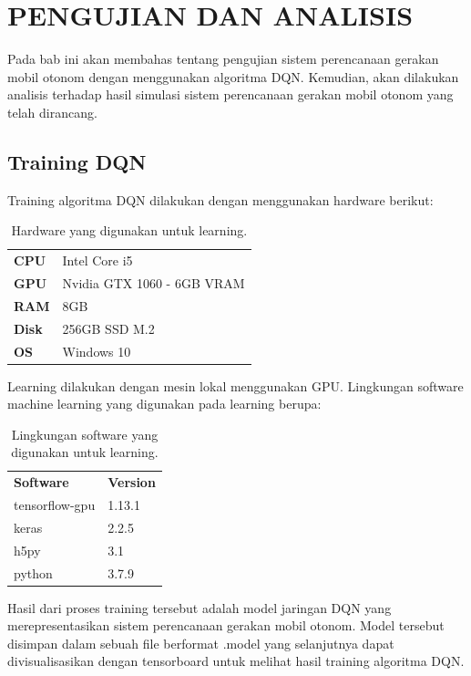 \chapter{PENGUJIAN DAN ANALISIS}
\label{chap:pengujiananalisis}


Pada bab ini akan membahas tentang pengujian sistem perencanaan gerakan mobil otonom dengan menggunakan algoritma DQN. Kemudian, akan dilakukan analisis terhadap hasil simulasi sistem
perencanaan gerakan mobil otonom yang telah dirancang.

\section{Training DQN}
\label{sec:training_dqn}
Training algoritma DQN dilakukan dengan menggunakan hardware berikut:
\begin{table}[H]
	\begin{tabular}{ll}
		\textbf{CPU}  & Intel Core i5              \\
		\textbf{GPU}  & Nvidia GTX 1060 - 6GB VRAM \\
		\textbf{RAM}  & 8GB                        \\
		\textbf{Disk} & 256GB SSD M.2              \\
		\textbf{OS}   & Windows 10                
	\end{tabular}
\caption{Hardware yang digunakan untuk learning.}
\label{tb:hardwaresetup}
\end{table}

Learning dilakukan dengan mesin lokal menggunakan GPU. Lingkungan software machine learning yang digunakan pada learning berupa:

\begin{table}[H]
	\begin{tabular}{ll}
		\textbf{Software}  & \textbf{Version}              \\
		tensorflow-gpu  & 1.13.1	\\
		keras  & 2.2.5					\\
		h5py & 3.1              \\
		python & 3.7.9              \\
	\end{tabular}
	\caption{Lingkungan software yang digunakan untuk learning.}
	\label{tb:softwaresetup}
\end{table}


Hasil dari proses training tersebut adalah model jaringan DQN yang merepresentasikan sistem perencanaan gerakan mobil otonom. Model tersebut disimpan dalam sebuah file berformat .model yang
selanjutnya dapat divisualisasikan dengan tensorboard untuk melihat hasil training algoritma DQN.

